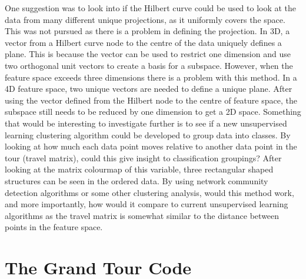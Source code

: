\documentclass[a4paper,11pt,twoside]{article}
\begin{document}
One suggestion was to look into if the Hilbert curve could be used to look at the data from many different unique projections, as it uniformly covers the space. This was not pursued as there is a problem in defining the projection. In 3D, a vector from a Hilbert curve node to the centre of the data uniquely defines a plane. This is because the vector can be used to restrict one dimension and use two orthogonal unit vectors to create a basis for a subspace. However, when the feature space exceeds three dimensions there is a problem with this method. In a 4D feature space, two unique vectors are needed to define a unique plane. After using the vector defined from the Hilbert node to the centre of feature space, the subspace still needs to be reduced by one dimension to get a 2D space.
\newline
\newline
Something that would be interesting to investigate further is to see if a new unsupervised learning clustering algorithm could be developed to group data into classes. By looking at how much each data point moves relative to another data point in the tour (travel matrix), could this give insight to classification groupings? After looking at the matrix colourmap of this variable, three rectangular shaped structures can be seen in the ordered data. By using network community detection algorithms or some other clustering analysis, would this method work, and more importantly, how would it compare to current unsupervised learning algorithms as the travel matrix is somewhat similar to the distance between points in the feature space.

\newpage



\newpage
\appendix
\section{The Grand Tour Code}
\end{document}
